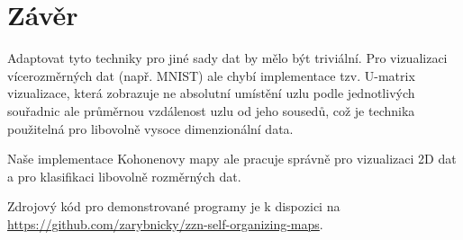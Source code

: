 \documentclass[11pt]{article}
\begin{document}
\newpage

\section{Závěr}
\label{sec:org3bc82d6}
Adaptovat tyto techniky pro jiné sady dat by mělo být triviální. Pro vizualizaci
vícerozměrných dat (např. MNIST) ale chybí implementace tzv. U-matrix
vizualizace, která zobrazuje ne absolutní umístění uzlu podle jednotlivých
souřadnic ale průměrnou vzdálenost uzlu od jeho sousedů, což je technika
použitelná pro libovolně vysoce dimenzionální data.

Naše implementace Kohonenovy mapy ale pracuje správně pro vizualizaci 2D dat a
pro klasifikaci libovolně rozměrných dat.

Zdrojový kód pro demonstrované programy je k dispozici na \url{https://github.com/zarybnicky/zzn-self-organizing-maps}.
\end{document}
